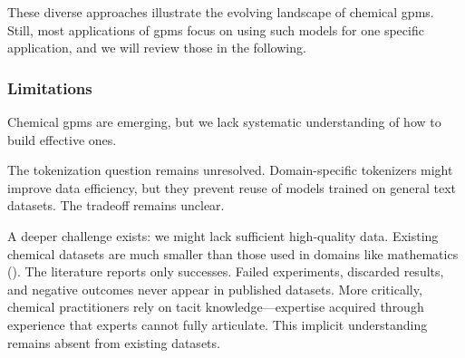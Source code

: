 These diverse approaches illustrate the evolving landscape of chemical \glspl{gpm}.
Still, most applications of \glspl{gpm} focus on using such models for one specific application, and we will review those in the following.

\subsubsection{Limitations}
Chemical \glspl{gpm} are emerging, but we lack systematic understanding of how to build effective ones.

The tokenization question remains unresolved. Domain-specific tokenizers might improve data efficiency, but they prevent reuse of models trained on general text datasets. The tradeoff remains unclear.

A deeper challenge exists: we might lack sufficient high-quality data. Existing chemical datasets are much smaller than those used in domains like mathematics (). The literature reports only successes. Failed experiments, discarded results, and negative outcomes never appear in published datasets. More critically, chemical practitioners rely on tacit knowledge\autocite{Polanyi_2009}---expertise acquired through experience that experts cannot fully articulate. This implicit understanding remains absent from existing datasets.



